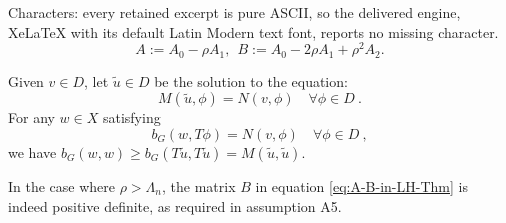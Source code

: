 \documentclass[10pt,a4paper]{amsart}
\begin{document}
Characters: every retained excerpt is pure ASCII, so the delivered engine, XeLaTeX with its default Latin Modern text font, reports no missing character.
\begin{equation}
\label{eq:A-B-in-LH-Thm}
A := A_0-\rho A_1, ~~ B := A_0-2\rho A_1 + \rho^2 A_2.
\end{equation}

\begin{lemma}
\label{lem:Lehmann}
Given $v \in D$, let  $\tilde{u}  \in D$ be the solution to the equation: 
\begin{equation}
	\label{eq:lehmann-setting}
 M(\tilde{u}, \phi)=N(v,\phi)\quad \forall \phi  \in D ~.
\end{equation}
For any $w \in X$  satisfying
\begin{equation*}
b_G(w, T \phi )=N(v,\phi)\quad \forall \phi  \in D ~,
\end{equation*}
we have $b_G(w, w) \ge b_G(T\tilde{u}, T\tilde{u})=M(\tilde{u}, \tilde{u})$.
\end{lemma}

\begin{lemma}
\label{lem:cond-for-positive-B}
In the case where $\rho > \Lambda_n$, the matrix $B$ in equation \eqref{eq:A-B-in-LH-Thm} is indeed positive definite, as required in assumption A5.
\end{lemma}
\end{document}
